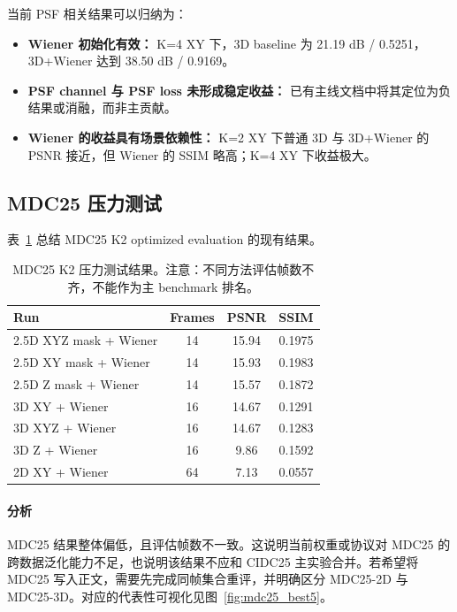 \documentclass[UTF8, scheme=plain, 11pt, a4paper]{ctexart}
\begin{document}
当前 PSF 相关结果可以归纳为：

\begin{itemize}[leftmargin=*]
  \item \textbf{Wiener 初始化有效：} K=4 XY 下，3D baseline 为 21.19 dB / 0.5251，3D+Wiener 达到 38.50 dB / 0.9169。
  \item \textbf{PSF channel 与 PSF loss 未形成稳定收益：} 已有主线文档中将其定位为负结果或消融，而非主贡献。
  \item \textbf{Wiener 的收益具有场景依赖性：} K=2 XY 下普通 3D 与 3D+Wiener 的 PSNR 接近，但 Wiener 的 SSIM 略高；K=4 XY 下收益极大。
\end{itemize}

\subsection{MDC25 压力测试}

表~\ref{tab:mdc25} 总结 MDC25 K2 optimized evaluation 的现有结果。

\begin{table}[H]
  \centering
  \caption{MDC25 K2 压力测试结果。注意：不同方法评估帧数不齐，不能作为主 benchmark 排名。}
  \label{tab:mdc25}
  \begin{tabular}{lccc}
    \toprule
    Run & Frames & PSNR & SSIM \\
    \midrule
    2.5D XYZ mask + Wiener & 14 & 15.94 & 0.1975 \\
    2.5D XY mask + Wiener & 14 & 15.93 & 0.1983 \\
    2.5D Z mask + Wiener & 14 & 15.57 & 0.1872 \\
    3D XY + Wiener & 16 & 14.67 & 0.1291 \\
    3D XYZ + Wiener & 16 & 14.67 & 0.1283 \\
    3D Z + Wiener & 16 & 9.86 & 0.1592 \\
    2D XY + Wiener & 64 & 7.13 & 0.0557 \\
    \bottomrule
  \end{tabular}
\end{table}

\paragraph{分析}
MDC25 结果整体偏低，且评估帧数不一致。这说明当前权重或协议对 MDC25 的跨数据泛化能力不足，也说明该结果不应和 CIDC25 主实验合并。若希望将 MDC25 写入正文，需要先完成同帧集合重评，并明确区分 MDC25-2D 与 MDC25-3D。对应的代表性可视化见图~\ref{fig:mdc25_best5}。
\end{document}
